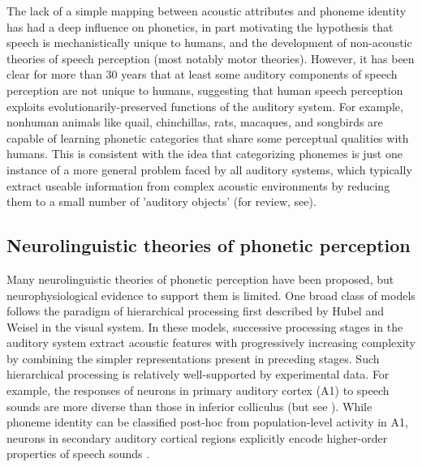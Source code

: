 \documentclass[preprint, NumberedRefs]{JASAnew}\usepackage[]{graphicx}\usepackage[]{color}
\begin{document}
The lack of a simple mapping between acoustic attributes and phoneme identity has had a deep influence on phonetics, in part motivating the hypothesis that speech is mechanistically unique to humans\cite{Lieberman1984}, and the development of non-acoustic theories of speech perception (most notably motor theories\cite{Diehl2004,Liberman1967,Liberman1985}). However, it has been clear for more than 30 years that at least some auditory components of speech perception are not unique to humans, suggesting that human speech perception exploits evolutionarily-preserved functions of the auditory system\cite{Kluender1987,Carbonell2014,Ghazanfar1999,Bornkessel-Schlesewsky2015}. For example, nonhuman animals like quail\cite{Kluender1987, Kluender1994}, chinchillas\cite{Kuhl1978}, rats\cite{Engineer2015}, macaques\cite{Kuhl1983}, and songbirds\cite{Dooling1995} are capable of learning phonetic categories that share some perceptual qualities with humans\cite{Lotto1997,Kluender2000}. This is consistent with the idea that categorizing phonemes is just one instance of a more general problem faced by all auditory systems, which typically extract useable information from complex acoustic environments by reducing them to a small number of 'auditory objects' (for review, see\cite{Bizley2013}).%
%
\subsection{Neurolinguistic theories of phonetic perception}

Many neurolinguistic theories of phonetic perception have been proposed\cite{Rauschecker2009a,Strauss2007,Kluender2013a,Liberman1985,Gaskell1997}, but neurophysiological evidence to support them is limited. One broad class of models follows the paradigm of hierarchical processing first described by Hubel and Weisel in the visual system\cite{Rauschecker2009a,Hubel1962,Strauss2007}. In these models, successive processing stages in the auditory system extract acoustic features with progressively increasing complexity by combining the simpler representations present in preceding stages. Such hierarchical processing is relatively well-supported by experimental data. For example, the responses of neurons in primary auditory cortex (A1) to speech sounds are more diverse than those in inferior colliculus\cite{Ranasinghe2013} (but see \cite{Bartlett2013}). While phoneme identity can be classified post-hoc from population-level activity in A1\cite{Centanni2013,Engineer2008,Steinschneider2003}, neurons in secondary auditory cortical regions explicitly encode higher-order properties of speech sounds \cite{Mesgarani2014,Belin2000a,Chang2010,Pasley2012,Bidelman2013}.
\end{document}
